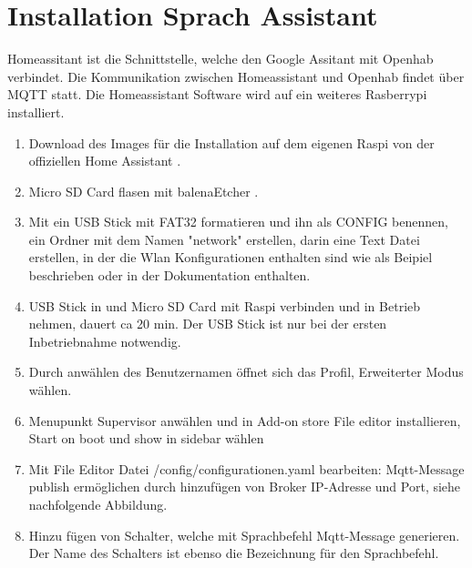 \clearpage
\section{Installation Sprach Assistant} \label{sec:Assistant}
Homeassitant ist die Schnittstelle, welche den Google Assitant mit Openhab verbindet. Die Kommunikation zwischen Homeassistant und Openhab findet über MQTT statt. Die Homeassistant Software wird auf ein weiteres Rasberrypi installiert.

\begin{enumerate}
	\item Download des Images für die Installation auf dem eigenen Raspi von der offiziellen Home Assistant \cite{assistant_installing_nodate}.
\item Micro SD Card flasen mit balenaEtcher \cite{noauthor_balenaetcher_nodate}. 
\item Mit ein USB Stick mit FAT32 formatieren und ihn als CONFIG benennen, ein Ordner mit dem Namen "network" erstellen, darin eine Text Datei erstellen, in der die Wlan Konfigurationen enthalten sind wie als Beipiel \cite{noauthor_home-assistantoperating-system_nodate} beschrieben oder in der Dokumentation enthalten.
\item USB Stick in und Micro SD Card mit Raspi verbinden und in Betrieb nehmen, dauert ca 20 min. Der USB Stick ist nur bei der ersten Inbetriebnahme notwendig.
\item Durch anwählen des Benutzernamen öffnet sich das Profil, Erweiterter Modus wählen.
\item Menupunkt Supervisor anwählen und in Add-on store File editor installieren, Start on boot und show in sidebar wählen
\item Mit File Editor Datei /config/configurationen.yaml bearbeiten: Mqtt-Message publish ermöglichen durch hinzufügen von Broker IP-Adresse und Port, siehe nachfolgende Abbildung.
\item Hinzu fügen von Schalter, welche mit Sprachbefehl Mqtt-Message generieren. Der Name des Schalters ist ebenso die Bezeichnung für den Sprachbefehl.
   \begin{figure}[H]
	\centering

\end{figure}
\end{enumerate}

